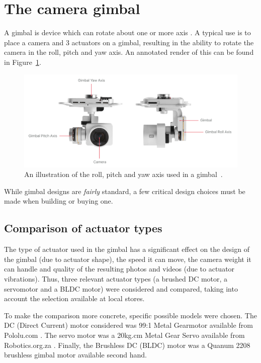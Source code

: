 \section{The camera gimbal}
A gimbal is device which can rotate about one or more axis \cite{website:definition_gimbal}. A typical use is to place a camera and 3 actuators on a gimbal, resulting in the ability to rotate the camera in the roll, pitch and yaw axis. An annotated render of this can be found in Figure~\ref{fig:roll_pitch_yaw_camera}.

\begin{figure}[h!]
  \centering
  \includegraphics[width=\textwidth]{literature_review/roll_pitch_yaw_gimbal.png}
  \caption{\label{fig:roll_pitch_yaw_camera} An illustration of the roll, pitch and yaw axis used in a gimbal~\cite{roll_pitch_yaw_camera}.}
\end{figure}

While gimbal designs are \emph{fairly} standard, a few critical design choices must be made when building or buying one.%

\subsection{Comparison of actuator types}\label{ssec:gimbal_comparison}
The type of actuator used in the gimbal has a significant effect on the design of the gimbal (due to actuator shape), the speed it can move, the camera weight it can handle and quality of the resulting photos and videos (due to actuator vibrations). Thus, three relevant actuator types (a brushed DC motor, a servomotor and a BLDC motor) were considered and compared, taking into account the selection available at local stores.

To make the comparison more concrete, specific possible models were chosen. The DC (Direct Current) motor considered was 99:1 Metal Gearmotor available from Pololu.com \cite{DC_motor_choice}. The servo motor was a 20kg.cm Metal Gear Servo available from Robotics.org.za \cite{servo_motor_choice}. Finally, the Brushless DC (BLDC) motor was a Quanum 2208 brushless gimbal motor \cite{bldc_motor_choice} available second hand.

